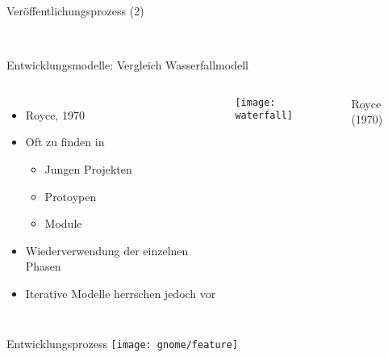 \documentclass[11pt]{beamer}
\newlength{\colwidth}
\begin{document}
\begin{frame}{Veröffentlichungsprozess (2)}
  \vspace{-1.4em}
\begin{figure}[htbp]
  \centering
  \setcounter{subfigure}{0}
   \\
\end{figure}
\end{frame}

\begin{frame}{Entwicklungsmodelle: Vergleich Wasserfallmodell}
  \begin{center}
  \begin{columns}[T]
  \column{\colwidth}
  \begin{itemize}
    \item Royce, 1970
    \item Oft zu finden in
    \begin{itemize}
      \item Jungen Projekten
      \item Protoypen
      \item Module
    \end{itemize}
    \item Wiederverwendung der einzelnen Phasen
    \item Iterative Modelle herrschen jedoch vor
  \end{itemize}
  \column{\colwidth}
  \texttt{[image: waterfall]}

  {\tiny\hfill
  Royce (1970)
  }

  \end{columns}
  \end{center}
\end{frame}

\begin{frame}{Entwicklungsprozess}
  \texttt{[image: gnome/feature]}
\end{frame}
\end{document}
